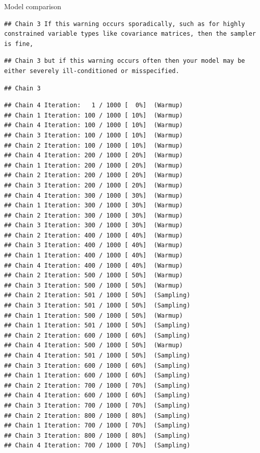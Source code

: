 \documentclass[
  ignorenonframetext,
]{beamer}
\begin{document}
\begin{frame}[fragile]{Model comparison}
\begin{verbatim}
## Chain 3 If this warning occurs sporadically, such as for highly constrained variable types like covariance matrices, then the sampler is fine,
\end{verbatim}

\begin{verbatim}
## Chain 3 but if this warning occurs often then your model may be either severely ill-conditioned or misspecified.
\end{verbatim}

\begin{verbatim}
## Chain 3
\end{verbatim}

\begin{verbatim}
## Chain 4 Iteration:   1 / 1000 [  0%]  (Warmup) 
## Chain 1 Iteration: 100 / 1000 [ 10%]  (Warmup) 
## Chain 4 Iteration: 100 / 1000 [ 10%]  (Warmup) 
## Chain 3 Iteration: 100 / 1000 [ 10%]  (Warmup) 
## Chain 2 Iteration: 100 / 1000 [ 10%]  (Warmup) 
## Chain 4 Iteration: 200 / 1000 [ 20%]  (Warmup) 
## Chain 1 Iteration: 200 / 1000 [ 20%]  (Warmup) 
## Chain 2 Iteration: 200 / 1000 [ 20%]  (Warmup) 
## Chain 3 Iteration: 200 / 1000 [ 20%]  (Warmup) 
## Chain 4 Iteration: 300 / 1000 [ 30%]  (Warmup) 
## Chain 1 Iteration: 300 / 1000 [ 30%]  (Warmup) 
## Chain 2 Iteration: 300 / 1000 [ 30%]  (Warmup) 
## Chain 3 Iteration: 300 / 1000 [ 30%]  (Warmup) 
## Chain 2 Iteration: 400 / 1000 [ 40%]  (Warmup) 
## Chain 3 Iteration: 400 / 1000 [ 40%]  (Warmup) 
## Chain 1 Iteration: 400 / 1000 [ 40%]  (Warmup) 
## Chain 4 Iteration: 400 / 1000 [ 40%]  (Warmup) 
## Chain 2 Iteration: 500 / 1000 [ 50%]  (Warmup) 
## Chain 3 Iteration: 500 / 1000 [ 50%]  (Warmup) 
## Chain 2 Iteration: 501 / 1000 [ 50%]  (Sampling) 
## Chain 3 Iteration: 501 / 1000 [ 50%]  (Sampling) 
## Chain 1 Iteration: 500 / 1000 [ 50%]  (Warmup) 
## Chain 1 Iteration: 501 / 1000 [ 50%]  (Sampling) 
## Chain 2 Iteration: 600 / 1000 [ 60%]  (Sampling) 
## Chain 4 Iteration: 500 / 1000 [ 50%]  (Warmup) 
## Chain 4 Iteration: 501 / 1000 [ 50%]  (Sampling) 
## Chain 3 Iteration: 600 / 1000 [ 60%]  (Sampling) 
## Chain 1 Iteration: 600 / 1000 [ 60%]  (Sampling) 
## Chain 2 Iteration: 700 / 1000 [ 70%]  (Sampling) 
## Chain 4 Iteration: 600 / 1000 [ 60%]  (Sampling) 
## Chain 3 Iteration: 700 / 1000 [ 70%]  (Sampling) 
## Chain 2 Iteration: 800 / 1000 [ 80%]  (Sampling) 
## Chain 1 Iteration: 700 / 1000 [ 70%]  (Sampling) 
## Chain 3 Iteration: 800 / 1000 [ 80%]  (Sampling) 
## Chain 4 Iteration: 700 / 1000 [ 70%]  (Sampling) 

\end{verbatim}
\end{frame}
\end{document}
